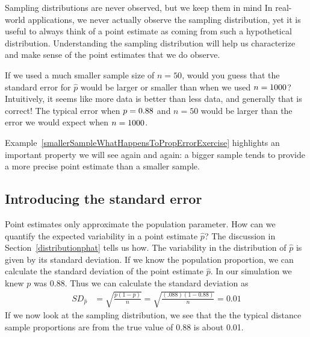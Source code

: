 \begin{onebox}{Sampling distributions are
    never observed, but we keep them in mind}
  In real-world applications, we never actually observe the
  sampling distribution, yet it is useful to always think of
  a point estimate as coming from such a hypothetical
  distribution.
  \mbox{Understanding} the sampling distribution will help us
  characterize and make sense of the point estimates that we
  do observe.
\end{onebox}

\begin{examplewrap}
\begin{nexample}{If we used a much smaller sample size of $n = 50$,
would you guess that the standard error for $\hat{p}$ would be larger
or smaller than when we used $n = 1000{}$?}
\label{smallerSampleWhatHappensToPropErrorExercise}
Intuitively, it seems like more data is better
than less data, and generally that is correct! The typical error
when $p = 0.88{}$ and $n = 50$ would be larger
than the error we would expect when $n = 1000{}$.
\end{nexample}
\end{examplewrap}

Example~\ref{smallerSampleWhatHappensToPropErrorExercise}
highlights an important property we will see again and again:
a bigger sample tends to provide a more precise point estimate
than a smaller sample.  

\subsection{Introducing the standard error}

Point estimates only approximate the population parameter.  How can we quantify the expected variability in a point estimate $\hat{p}$? The discussion in Section~\ref{distributionphat} tells us how. The variability in the distribution of $\hat{p}$ is given by its standard deviation. If we know the population proportion, we can calculate the standard deviation of the point estimate $\hat{p}$.  In our simulation we knew $p$ was 0.88.  Thus we can calculate the standard deviation as 
\begin{align*}
SD_{\hat{p}}&=\sqrt{\frac{p(1-p)}{n}} = \sqrt{\frac{(.088)(1-0.88)}{n}}= 0.01
\end{align*}
If we now look at the sampling distribution, we see that the the typical distance sample proportions are from the true value of 0.88 is about 0.01.

